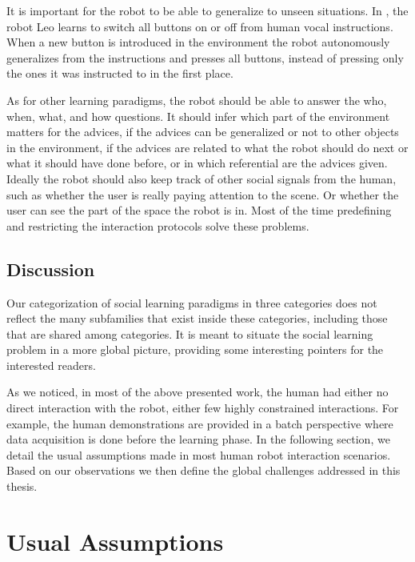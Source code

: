 It is important for the robot to be able to generalize to unseen situations. In \cite{lockerd2004tutelage}, the robot Leo learns to switch all buttons on or off from human vocal instructions. When a new button is introduced in the environment the robot autonomously generalizes from the instructions and presses all buttons, instead of pressing only the ones it was instructed to in the first place.


As for other learning paradigms, the robot should be able to answer the who, when, what, and how questions. It should infer which part of the environment matters for the advices, if the advices can be generalized or not to other objects in the environment, if the advices are related to what the robot should do next or what it should have done before, or in which referential are the advices given. Ideally the robot should also keep track of other social signals from the human, such as whether the user is really paying attention to the scene.  Or whether the user can see the part of the space the robot is in. Most of the time predefining and restricting the interaction protocols solve these problems.

\subsection{Discussion}

Our categorization of social learning paradigms in three categories does not reflect the many subfamilies that exist inside these categories, including those that are shared among categories. It is meant to situate the social learning problem in a more global picture, providing some interesting pointers for the interested readers. 

As we noticed, in most of the above presented work, the human had either no direct interaction with the robot, either few highly constrained interactions. For example, the human demonstrations are provided in a batch perspective where data acquisition is done before the learning phase. In the following section, we detail the usual assumptions made in most human robot interaction scenarios.  Based on our observations we then define the global challenges addressed in this thesis.

\section{Usual Assumptions}

